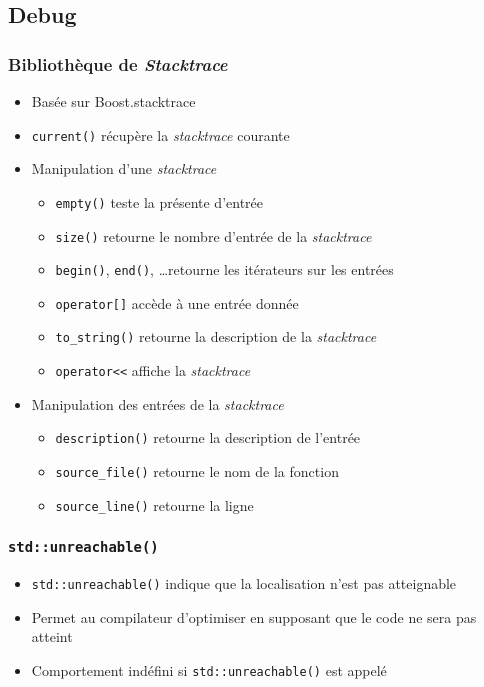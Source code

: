 \documentclass[C++.tex]{subfiles}
\begin{document}
\subsection*{Debug}
\begin{frame}[fragile]
	\frametitle{Bibliothèque de \textit{Stacktrace}}
	\begin{itemize}
		\item Basée sur Boost.stacktrace
		\item \lstinline|current()| récupère la \textit{stacktrace} courante
		\item Manipulation d'une \textit{stacktrace}
		\begin{itemize}
			\item \lstinline|empty()| teste la présente d'entrée
			\item \lstinline|size()| retourne le nombre d'entrée de la \textit{stacktrace}
			\item \lstinline|begin()|, \lstinline|end()|, \ldots retourne les itérateurs sur les entrées
			\item \lstinline|operator[]| accède à une entrée donnée
			\item \lstinline|to_string()| retourne la description de la \textit{stacktrace}
			\item \lstinline|operator<<| affiche la \textit{stacktrace}
		\end{itemize}
		\item Manipulation des entrées de la \textit{stacktrace}
		\begin{itemize}
			\item \lstinline|description()| retourne la description de l'entrée
			\item \lstinline|source_file()| retourne le nom de la fonction
			\item \lstinline|source_line()| retourne la ligne
		\end{itemize}
	\end{itemize}
\end{frame}

\begin{frame}[fragile]
	\frametitle{\lstinline|std::unreachable()|}
	\begin{itemize}
		\item \lstinline|std::unreachable()| indique que la localisation n'est pas atteignable
		\item Permet au compilateur d'optimiser en supposant que le code ne sera pas atteint
		\item Comportement indéfini si \lstinline|std::unreachable()| est appelé


	\end{itemize}
\end{frame}
\end{document}
